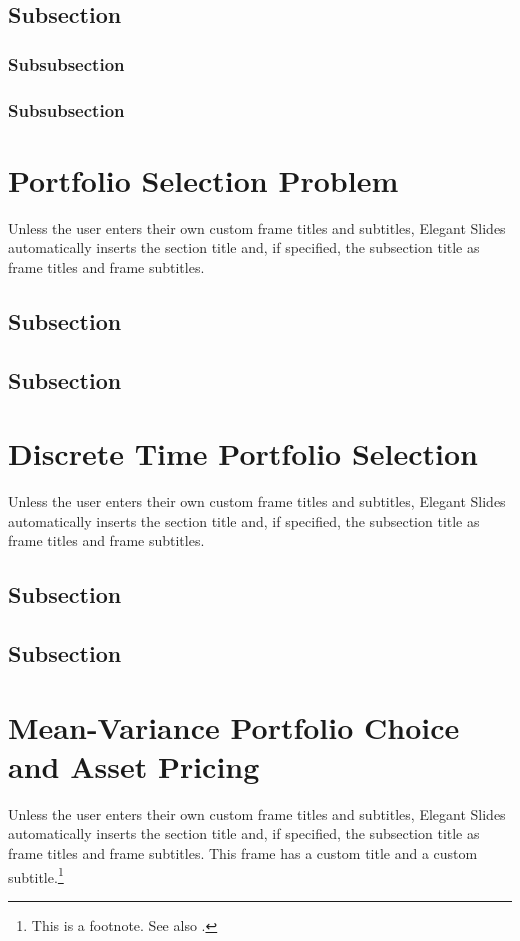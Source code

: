 \documentclass[
14pt,notheorems,hyperref={pdfauthor=whatever}
]{beamer}
\begin{document}
\subsection{Subsection}
\subsubsection{Subsubsection}
\subsubsection{Subsubsection}

\section{Portfolio Selection Problem}
\begin{frame}
    Unless the user enters their own custom frame titles and subtitles, Elegant Slides automatically inserts the section title and, if specified, the subsection title as frame titles and frame subtitles.
\end{frame}
\subsection{Subsection}
\subsection{Subsection}

\section{Discrete Time Portfolio Selection}
\begin{frame}
    Unless the user enters their own custom frame titles and subtitles, Elegant Slides automatically inserts the section title and, if specified, the subsection title as frame titles and frame subtitles.
\end{frame}
\subsection{Subsection}
\subsection{Subsection}

\section{Mean-Variance Portfolio Choice and Asset Pricing}
\begin{frame}
    Unless the user enters their own custom frame titles and subtitles, Elegant Slides automatically inserts the section title and, if specified, the subsection title as frame titles and frame subtitles.
    This frame has a custom title and a custom subtitle.\footnote{This is a footnote. See also \textcite{example_2022}. }
\end{frame}
\end{document}
